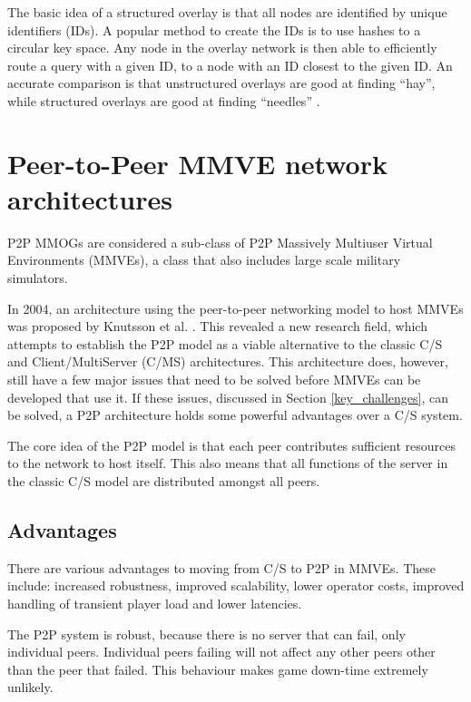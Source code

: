 The basic idea of a structured overlay is that all nodes are identified by unique identifiers (IDs). A popular method to create the IDs is to use
hashes to a circular key space. Any node in the overlay network is then able to efficiently route a query with a given ID, to a node with an ID
closest to the given ID. An accurate comparison is that unstructured overlays are good at finding ``hay'', while structured overlays are good at
finding ``needles'' \cite{Rodrigues_acm_comms_p2p}.


\section{Peer-to-Peer MMVE network architectures}
\label{p2p_network_architectures}

P2P MMOGs are considered a sub-class of P2P Massively Multiuser Virtual Environments (MMVEs), a class that also includes large scale military simulators.

In 2004, an architecture using the peer-to-peer networking model to host MMVEs was proposed by Knutsson et al. \cite{knutsson_p2p_first}. This
revealed a new research field, which attempts to establish the P2P model as a viable alternative to the classic C/S and Client/MultiServer (C/MS)
architectures. This architecture does, however, still have a few major issues that need to be solved before MMVEs can be developed that use it. If
these issues, discussed in Section \ref{key_challenges}, can be solved, a P2P architecture holds some powerful advantages over a C/S system.

The core idea of the P2P model is that each peer contributes sufficient resources to the network to host itself. This also means that all functions
of the server in the classic C/S model are distributed amongst all peers.

\subsection{Advantages}
\label{p2p_advantages}

There are various advantages to moving from C/S to P2P in MMVEs. These include: increased robustness, improved scalability, lower operator costs,
improved handling of transient player load and lower latencies.

The P2P system is robust, because there is no server that can fail, only individual peers. Individual peers failing will not affect any other peers
other than the peer that failed. This behaviour makes game down-time extremely unlikely.

